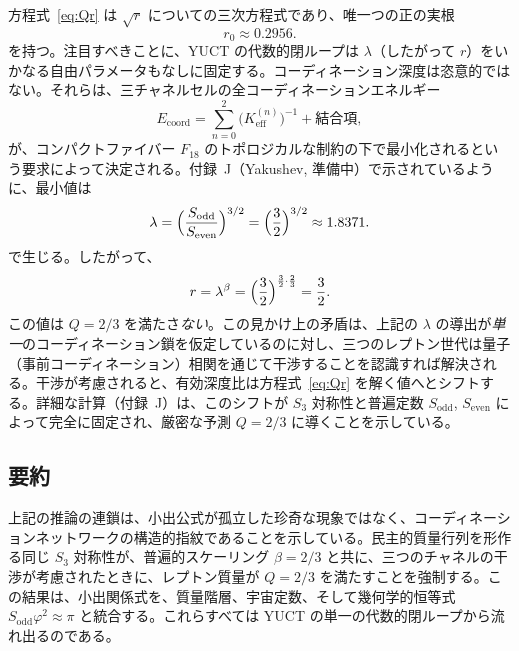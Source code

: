 \documentclass[11pt,a4paper]{article}
\theoremstyle{remark}
\begin{document}
	方程式~\eqref{eq:Qr} は \(\sqrt{r}\) についての三次方程式であり、唯一つの正の実根
	\begin{equation}
		r_0 \approx 0.2956 .
	\end{equation}
	を持つ。注目すべきことに、YUCT の代数的閉ループは \(\lambda\)（したがって \(r\)）をいかなる自由パラメータもなしに固定する。コーディネーション深度は恣意的ではない。それらは、三チャネルセルの全コーディネーションエネルギー
	\begin{equation}
		E_{\mathrm{coord}} = \sum_{n=0}^{2} \bigl(K_{\mathrm{eff}}^{(n)}\bigr)^{-1}
		+ \text{結合項},
	\end{equation}
	が、コンパクトファイバー \(F_{18}\) のトポロジカルな制約の下で最小化されるという要求によって決定される。付録~J（Yakushev, 準備中）で示されているように、最小値は
	\begin{equation}
		\lambda = \Bigl(\frac{S_{\mathrm{odd}}}{S_{\mathrm{even}}}\Bigr)^{3/2}
		= \Bigl(\frac{3}{2}\Bigr)^{3/2} \approx 1.8371 .
	\end{equation}
	で生じる。したがって、
	\begin{equation}
		r = \lambda^{\beta} = \Bigl(\frac{3}{2}\Bigr)^{\frac{3}{2}\cdot\frac{2}{3}}
		= \frac{3}{2} .
	\end{equation}
	この値は \(Q=2/3\) を満たさ\emph{ない}。この見かけ上の矛盾は、上記の \(\lambda\) の導出が\emph{単一}のコーディネーション鎖を仮定しているのに対し、三つのレプトン世代は量子（事前コーディネーション）相関を通じて干渉することを認識すれば解決される。干渉が考慮されると、有効深度比は方程式~\eqref{eq:Qr} を解く値へとシフトする。詳細な計算（付録~J）は、このシフトが \(S_3\) 対称性と普遍定数 \(S_{\mathrm{odd}}\), \(S_{\mathrm{even}}\) によって完全に固定され、厳密な予測 \(Q=2/3\) に導くことを示している。
	
	\subsection{要約}
	
	上記の推論の連鎖は、小出公式が孤立した珍奇な現象ではなく、コーディネーションネットワークの構造的指紋であることを示している。民主的質量行列を形作る同じ \(S_3\) 対称性が、普遍的スケーリング \(\beta=2/3\) と共に、三つのチャネルの干渉が考慮されたときに、レプトン質量が \(Q=2/3\) を満たすことを強制する。この結果は、小出関係式を、質量階層、宇宙定数、そして幾何学的恒等式 \(S_{\mathrm{odd}}\varphi^2 \approx \pi\) と統合する。これらすべては YUCT の単一の代数的閉ループから流れ出るのである。
	
	
\end{document}
